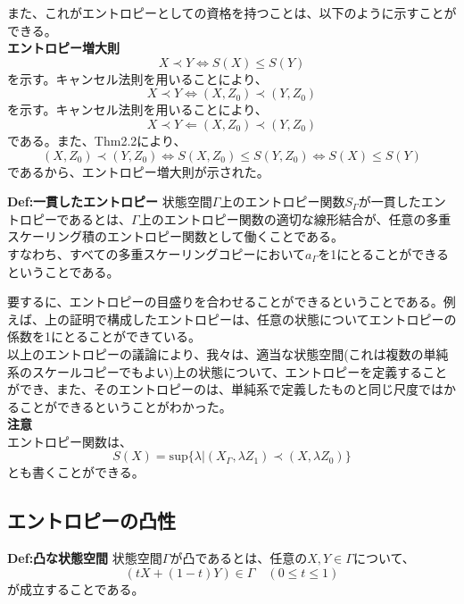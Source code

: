 \documentclass[a4paper,11pt]{jsarticle}
\numberwithin{equation}{section}
\begin{document}
また、これがエントロピーとしての資格を持つことは、以下のように示すことができる。\\
\textbf{エントロピー増大則}\\
\begin{equation}
    X \prec Y \Leftrightarrow S(X) \leq S(Y)
\end{equation}
を示す。キャンセル法則を用いることにより、
\begin{equation}
    X \prec Y \Leftrightarrow (X,Z_0) \prec (Y,Z_0)
\end{equation}
を示す。キャンセル法則を用いることにより、
\begin{equation}
    X \prec Y \Leftarrow (X,Z_0) \prec (Y,Z_0)
\end{equation}
である。また、Thm2.2により、
\begin{equation}
    (X,Z_0) \prec (Y,Z_0) \Leftrightarrow S(X,Z_0) \leq S(Y,Z_0) \Leftrightarrow S(X) \leq S(Y)
\end{equation}
であるから、エントロピー増大則が示された。\hfill\qedsymbol\\

\begin{itembox}[l]{\textbf{Def:一貫したエントロピー}}
    状態空間$\Gamma$上のエントロピー関数$S_{\Gamma}$が一貫したエントロピーであるとは、$\Gamma$上のエントロピー関数の適切な線形結合が、任意の多重スケーリング積のエントロピー関数として働くことである。\\
    すなわち、すべての多重スケーリングコピーにおいて$a_{\Gamma}$を1にとることができるということである。
\end{itembox}
要するに、エントロピーの目盛りを合わせることができるということである。例えば、上の証明で構成したエントロピーは、任意の状態についてエントロピーの係数を1にとることができている。\\

以上のエントロピーの議論により、我々は、適当な状態空間(これは複数の単純系のスケールコピーでもよい)上の状態について、エントロピーを定義することができ、また、そのエントロピーのは、単純系で定義したものと同じ尺度ではかることができるということがわかった。\\

\textbf{注意}\\
エントロピー関数は、
\begin{equation}
    S(X) =\text{sup}\{\lambda|(X_{\Gamma},\lambda Z_1)\prec (X,\lambda Z_0)\}
\end{equation}
とも書くことができる。\\

\subsection{エントロピーの凸性}
\begin{itembox}[l]{\textbf{Def:凸な状態空間}}
    状態空間$\Gamma$が凸であるとは、任意の$X,Y \in \Gamma$について、
    \begin{equation}
        (tX+(1-t)Y) \in \Gamma \quad (0 \leq t \leq 1)
    \end{equation}
    が成立することである。
\end{itembox}
\end{document}
